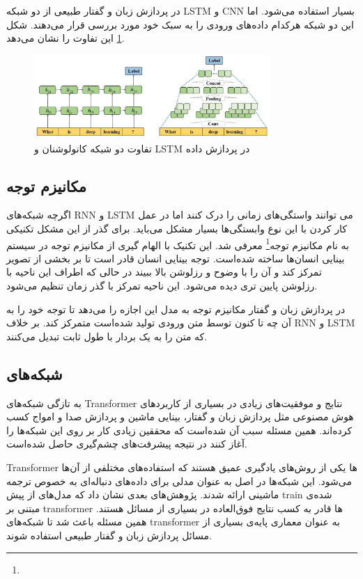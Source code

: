 \documentclass[12pt, a4paper, oneside]{report}
\begin{document}
در پردازش زبان و گفتار طبیعی از دو شبکه
LSTM
و
CNN
بسیار استفاده می‌شود. اما این دو شبکه هرکدام داده‌های ورودی را به سبک خود مورد بررسی قرار می‌دهند. شکل
\ref{fig:LSTMvsCNN}
این تفاوت را نشان می‌دهد.

\begin{figure}[!ht]
    \centering
    \includegraphics[width=0.8\textwidth]{LSTMvsCNN}
    \caption{تفاوت دو شبکه کانولوشنان و LSTM در پردازش داده}
    \label{fig:LSTMvsCNN}
\end{figure}

\subsection{مکانیزم توجه}

اگرچه شبکه‌های
RNN
و
LSTM
می توانند واستگی‌های زمانی را درک کنند اما در عمل کار کردن با این نوع وابستگی‌ها بسیار مشکل می‌باید. برای گذر از این
مشکل تکنیکی به نام
مکانیزم توجه\footnote{}
معرفی شد. این تکنیک با الهام گیری از مکانیزم توجه در سیستم بینایی انسان‌ها ساخته شده‌است. توجه بینایی انسان قادر است
تا بر بخشی از تصویر تمرکز کند و آن را با وضوح و رزلوشن بالا ببیند در حالی که اطراف این ناحیه با رزلوشن پایین تری دیده می‌شود.
این ناحیه تمرکز با گذر زمان تنظیم می‌شود.

در پردازش زبان و گفتار مکانیزم توجه به مدل این اجازه را می‌دهد تا توجه خود را به آن چه تا کنون توسط متن ورودی تولید شده‌است
متمرکز کند. بر خلاف
RNN
و
LSTM
که متن را به یک بردار با طول ثابت تبدیل می‌کنند.

\subsection{شبکه‌های }
به تازگی شبکه‌های
Transformer
نتایج و موفقیت‌های زیادی در بسیاری از کاربرد‌های هوش مصنوعی مثل پردازش زبان و گفتار، بینایی ماشین و
پردازش صدا و امواج کسب کرده‌اند. همین مسئله سبب آن شده‌است که محققین زیادی کار بر روی این شبکه‌ها را آغاز کنند
در نتیجه پیشرفت‌های چشم‌گیری حاصل شده‌است.

Transformer
ها یکی از روش‌های یادگیری عمیق
هستند که استفاده‌های مختلفی از آن‌ها می‌شود. این شبکه‌ها در اصل به عنوان مدلی برای داده‌های دنباله‌ای به خصوص
ترجمه ماشینی ارائه شدند. پژوهش‌های بعدی نشان داد که مدل‌های از پیش
train
شده‌ی مبتنی بر
transformer
ها قادر به کسب نتایج فوق‌العاده در بسیاری از مسائل هستند. همین مسئله باعث شد تا شبکه‌های
transformer
به عنوان معماری پایه‌ی بسیاری از مسائل پردازش زبان و گفتار طبیعی استفاده شوند.
\end{document}
